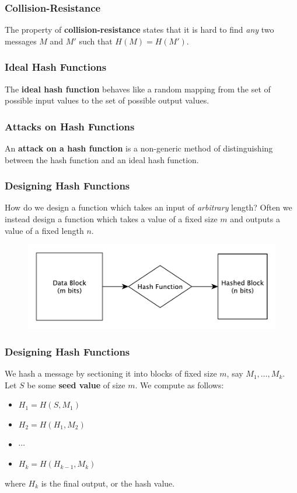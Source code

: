 \documentclass{beamer}
\newcommand{\<}{\langle}
\renewcommand{\>}{\rangle}
\begin{document}
\begin{frame}
\frametitle{Collision-Resistance}

The property of \textbf{collision-resistance} states that it is hard to find \emph{any} two messages $M$ and $M'$ such that $H(M) = H(M')$. 
\end{frame}


\begin{frame}
\frametitle{Ideal Hash Functions}

The \textbf{ideal hash function} behaves like a random mapping from the set of possible input values to the set of possible output values.
\end{frame}


\begin{frame}
\frametitle{Attacks on Hash Functions}

An \textbf{attack on a hash function} is a non-generic method of distinguishing between the hash function and an ideal hash function.
\end{frame}


\begin{frame}
\frametitle{Designing Hash Functions}

How do we design a function which takes an input of \emph{arbitrary} length? Often we instead design a function which takes a value of a fixed size $m$ and outputs a value of a fixed length $n$. 
\begin{figure}
\includegraphics[scale=.6]{IMG/hash2}
\end{figure}
\end{frame}


\begin{frame}
\frametitle{Designing Hash Functions}

We hash a message by sectioning it into blocks of fixed size $m$, say $M_1,\dots, M_k$. Let $S$ be some \textbf{seed value} of size $m$. We compute as follows:
\begin{itemize}
\item $H_1 = H(S, M_1)$
\item $H_2 = H(H_1, M_2)$
\item $\cdots$
\item $H_k = H(H_{k-1}, M_k)$
\end{itemize}
where $H_k$ is the final output, or the hash value. 
\end{frame}
\end{document}
